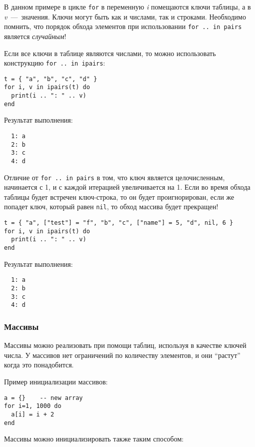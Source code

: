 В данном примере в цикле \lstinline{for} в переменную \emph{i} помещаются ключи таблицы, а в \emph{v}~---~значения. 
Ключи могут быть как и числами, так и строками. Необходимо помнить, что порядок обхода элементов при использовании \lstinline{for .. in pairs} является \emph{случайным}!

Если все ключи в таблице являются числами, то можно использовать конструкцию \lstinline{for .. in ipairs}:

\begin{lstlisting}
t = { "a", "b", "c", "d" }  
for i, v in ipairs(t) do  
  print(i .. ": " .. v)   
end  
\end{lstlisting}

Результат выполнения:

\begin{lstlisting}
  1: a
  2: b
  3: c
  4: d
\end{lstlisting}

Отличие от \lstinline{for .. in pairs} в том, что ключ является целочисленным, начинается с 1, и с каждой итерацией увеличивается на 1. Если во время обхода таблицы будет встречен ключ-строка, то он будет проигнорирован, если же попадет ключ, который равен \lstinline{nil}, то обход массива будет прекращен!

\begin{lstlisting}
t = { "a", ["test"] = "f", "b", "c", ["name"] = 5, "d", nil, 6 }  
for i, v in ipairs(t) do  
  print(i .. ": " .. v)   
end  
\end{lstlisting}

Результат выполнения:

\begin{lstlisting}
  1: a
  2: b
  3: c
  4: d
\end{lstlisting}

\subsubsection{Массивы}

Массивы можно реализовать при помощи таблиц, используя в качестве ключей числа. 
У массивов нет ограничений по количеству элементов, и они ``растут'' когда это понадобится.

Пример инициализации массивов:

\begin{lstlisting}
a = {}    -- new array
for i=1, 1000 do
  a[i] = i + 2 
end
\end{lstlisting}

Массивы можно инициализировать также таким способом:

